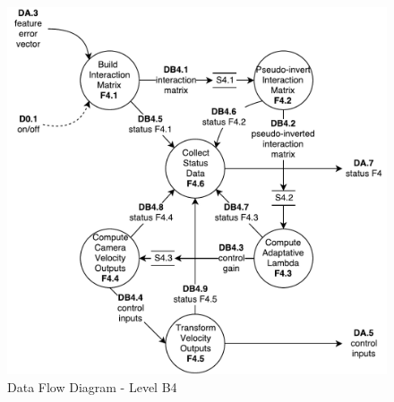 \begin{figure}[!htb]
	\centering
	\includegraphics[width=\textwidth]{content/chapter_03/images/sa_diagram_05.pdf}
	\caption{Data Flow Diagram - Level B4}
	\label{fig:sa_diag_05}
\end{figure}

\pagebreak

